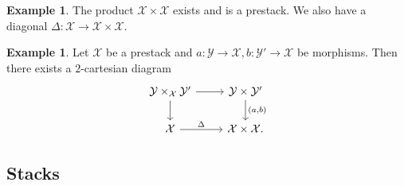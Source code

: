\documentclass[leqno, openany]{memoir}
\theoremstyle{definition}
\newtheorem{exm}[thm]{Example}
\theoremstyle{remark}
\theoremstyle{plain}
\theoremstyle{definition}
\theoremstyle{remark}
\newcommand{\mc}[1]{\mathcal{#1}}
\begin{document}
\begin{exm}
    The product $\mc{X} \times \mc{X}$ exists and is a prestack. We also have a diagonal $\Delta \colon \mc{X} \to \mc{X} \times \mc{X}$.
\end{exm}

\begin{exm}
    Let $\mc{X}$ be a prestack and $a \colon \mc{Y} \to \mc{X}, b \colon \mc{Y}' \to \mc{X}$ be morphisms. Then there exists a $2$-cartesian diagram
    \begin{equation*}
    \begin{tikzcd}
        \mc{Y} \times_{\mc{X}} \mc{Y}' \ar{r} \ar{d} & \mc{Y} \times \mc{Y}' \ar{d}{(a,b)} \\
        \mc{X} \ar{r}{\Delta} & \mc{X} \times \mc{X}.
    \end{tikzcd}
    \end{equation*}
\end{exm}

\subsection{Stacks}%
\label{sub:stacks}
\end{document}
